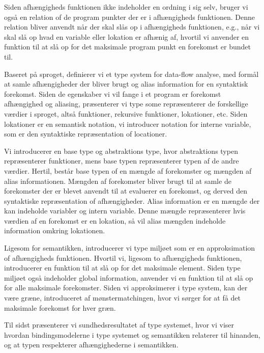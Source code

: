 \documentclass[../master.tex]{subfiles}
\begin{document}
Siden afhængigheds funktionen ikke indeholder en ordning i sig selv, bruger vi også en relation of de program punkter der er i afhængigheds funktionen.
Denne relation bliver anvendt når der skal slås op i afhængigheds funktionen, e.g., når vi skal slå op hvad en variable eller lokation er afhænig af, hvortil vi anvender en funktion til at slå op for det maksimale program punkt en forekomst er bundet til.
\bigskip

Baseret på sproget, definierer vi et type system for data-flow analyse, med formål at samle afhængigheder der bliver brugt og alias information for en syntaktisk forekomst.
Siden de egenskaber vi vil fange i et program er forekomst afhængighed og aliasing, præsenterer vi type some repræsenterer de forskellige værdier i sproget, altså funktioner, rekursive funktioner, lokationer, etc.
Siden lokationer er en semantisk notation, vi introducer notation for interne variable, som er den syntaktiske repræsentation of locationer.

Vi introducerer en base type og abstraktions type, hvor abstraktions typen repræsenterer funktioner, mens base typen repræsenterer typen af de andre værdier.
Hertil, består base typen of en mængde af forekomster og mængden af alias informationen.
Mængden af forekomster bliver brugt til at samle de forekomster der er blevet anvendt til at evaluerer en forekomst, og derved den syntaktiske repræsentation of afhængigheder.
Alias information er en mængde der kan indeholde variabler og intern variable.
Denne mængde repræsenterer hvis værdien af en forekomst er en lokation, så vil alias mængden indeholde information omkring lokationen.

Ligesom for semantikken, introducerer vi type miljøet som er en approksimation of afhængigheds funktionen.
Hvortil vi, ligesom to afhængigheds funktionen, introducerer en funktion til at slå op for det maksimale element.
Siden type miljøet også indeholder global information, anvender vi en funktion til at slå op for alle maksimale forekomster.
Siden vi approksimerer i type system, kan der være græne, introduceret af mønstermatchingen, hvor vi sørger for at få det maksimale forekomst for hver græn.

Til sidst præsenterer vi sundhedsresultatet af type systemet, hvor vi viser hvordan bindingsmodelerne i type systemet og semantikken relaterer til hinanden, og at typen respekterer afhængighederne i semantikken.



\newpage
\end{document}
